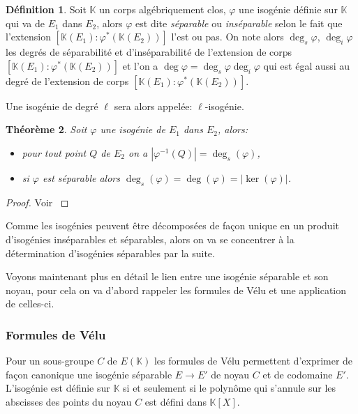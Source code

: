 \documentclass[10pt,a4paper]{book}
\theoremstyle{plain}
\newtheorem{thm}{Théorème}[chapter]
\theoremstyle{definition}
\theoremstyle{definition}
\theoremstyle{definition}
\theoremstyle{definition}
\newtheorem{defi}[thm]{Définition}
\theoremstyle{remark}
\theoremstyle{remark}
\theoremstyle{definition}
\begin{document}
\begin{defi}
Soit $\mathbb{K}$ un corps algébriquement clos, $\varphi$ une isogénie définie sur $\mathbb{K}$ qui va de $E_1$ dans $E_2$, alors $\varphi$ est dite \emph{séparable} ou \emph{inséparable} selon le fait que l'extension $[\mathbb{K}(E_1):\varphi^*(\mathbb{K}(E_2))]$ l'est ou pas. On note alors \emph{$\deg_s{\varphi}$}, \emph{$\deg_i{\varphi}$} les degrés de séparabilité et d'inséparabilité de l'extension de corps $[\mathbb{K}(E_1):\varphi^*(\mathbb{K}(E_2))]$ et l'on a $\deg{\varphi}=\deg_s{\varphi}\deg_i{\varphi}$ qui est égal aussi au degré de l'extension de corps $[\mathbb{K}(E_1):\varphi^*(\mathbb{K}(E_2))]$.
\end{defi}


Une isogénie de degré $\ell$ sera alors appelée: $\ell$-isogénie.

\begin{thm}
Soit $\varphi$ une isogénie de $E_1$ dans $E_2$, alors:
\begin{itemize}
\item pour tout point $Q$ de $E_2$ on a $|\varphi^{-1}(Q)|=\deg_s(\varphi)$,
\item si $\varphi$ est séparable alors $\deg_s(\varphi)=\deg(\varphi)=|\ker(\varphi)|$.
\end{itemize}
\end{thm}

\begin{proof}
Voir \cite[III.4.10]{Silv1}
\end{proof}

Comme les isogénies peuvent être décomposées de façon unique en un produit 
d'isogénies inséparables et séparables, alors on va se concentrer à la 
détermination d'isogénies séparables par la suite.

Voyons maintenant plus en détail le lien entre une isogénie séparable et son 
noyau, pour cela on va d'abord rappeler les formules de Vélu et une application
de celles-ci.

\subsubsection{Formules de Vélu}
\label{sse:Vel}
Pour un sous-groupe $C$ de $E(\mathbb{K})$ les formules de Vélu \cite{velu1971} permettent d'exprimer de façon canonique une isogénie séparable $E \rightarrow E'$ de noyau $C$ et de codomaine $E'$.  L'isogénie est définie sur $\mathbb{K}$ si et seulement si le polynôme qui s'annule sur les abscisses des points du noyau $C$ est défini dans $\mathbb{K}[X]$.
\end{document}
